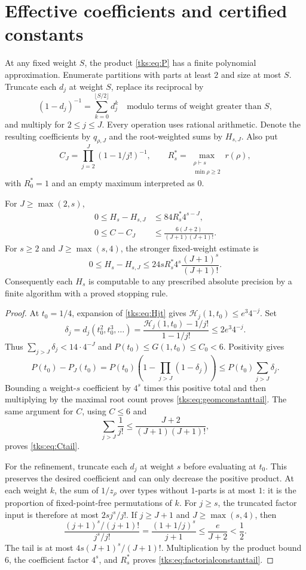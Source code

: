 \section{Effective coefficients and certified constants}\label{tks:sec:constants}
At any fixed weight $S$, the product \eqref{tks:eq:P} has a finite polynomial approximation. Enumerate partitions with parts at least $2$ and size at most $S$. Truncate each $d_j$ at weight $S$, replace its reciprocal by
\[
(1-d_j)^{-1}=\sum_{k=0}^{\lfloor S/2\rfloor}d_j^k
\quad\text{modulo terms of weight greater than }S,
\]
and multiply for $2\leq j\leq J$. Every operation uses rational arithmetic. Denote the resulting coefficients by $q_{\rho,J}$ and the root-weighted sums by $H_{s,J}$. Also put
\[
C_J=\prod_{j=2}^{J}(1-1/j!)^{-1},\qquad
R_s^*=\max_{\substack{\rho\vdash s\\\min\rho\geq2}}r(\rho),
\]
with $R_0^*=1$ and an empty maximum interpreted as $0$.

\begin{proposition}\label{tks:prop:tails}
For $J\geq\max(2,s)$,
\begin{align}
0\leq H_s-H_{s,J}&\leq84R_s^*4^{s-J},\label{tks:eq:geomconstanttail}\\
0\leq C-C_J&\leq\frac{6(J+2)}{(J+1)(J+1)!}.\label{tks:eq:Ctail}
\end{align}
For $s\geq2$ and $J\geq\max(s,4)$, the stronger fixed-weight estimate is
\begin{equation}\label{tks:eq:factorialconstanttail}
0\leq H_s-H_{s,J}
 \leq24sR_s^*4^s\frac{(J+1)^s}{(J+1)!}.
\end{equation}
Consequently each $H_s$ is computable to any prescribed absolute precision by a finite algorithm with a proved stopping rule.
\end{proposition}
\begin{proof}
At $t_0=1/4$, expansion of \eqref{tks:eq:Hjt} gives
$\mathcal H_j(1,t_0)\leq e^3 4^{-j}$. Set
\[
\delta_j=d_j(t_0^2,t_0^3,\ldots)
 =\frac{\mathcal H_j(1,t_0)-1/j!}{1-1/j!}\leq2e^3 4^{-j}.
\]
Thus $\sum_{j>J}\delta_j<14\cdot4^{-J}$ and
$P(t_0)\leq G(1,t_0)\leq C_0<6$. Positivity gives
\[
P(t_0)-P_J(t_0)
 =P(t_0)\left(1-\prod_{j>J}(1-\delta_j)\right)
 \leq P(t_0)\sum_{j>J}\delta_j.
\]
Bounding a weight-$s$ coefficient by $4^s$ times this positive total and then multiplying by the maximal root count proves \eqref{tks:eq:geomconstanttail}. The same argument for $C$, using $C\leq6$ and
\[
\sum_{j>J}\frac1{j!}\leq\frac{J+2}{(J+1)(J+1)!},
\]
proves \eqref{tks:eq:Ctail}.

For the refinement, truncate each $d_j$ at weight $s$ before evaluating at $t_0$. This preserves the desired coefficient and can only decrease the positive product. At each weight $k$, the sum of $1/z_\rho$ over types without $1$-parts is at most $1$: it is the proportion of fixed-point-free permutations of $k$. For $j\geq s$, the truncated factor input is therefore at most $2s j^s/j!$. If $j\geq J+1$ and $J\geq\max(s,4)$, then
\[
\frac{(j+1)^s/(j+1)!}{j^s/j!}
 =\frac{(1+1/j)^s}{j+1}\leq\frac e{J+2}<\frac12.
\]
The tail is at most $4s(J+1)^s/(J+1)!$. Multiplication by the product bound $6$, the coefficient factor $4^s$, and $R_s^*$ proves \eqref{tks:eq:factorialconstanttail}.
\end{proof}

